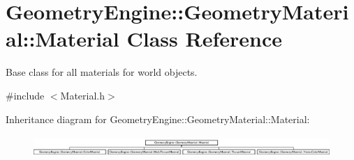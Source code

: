 \hypertarget{class_geometry_engine_1_1_geometry_material_1_1_material}{}\section{Geometry\+Engine\+::Geometry\+Material\+::Material Class Reference}
\label{class_geometry_engine_1_1_geometry_material_1_1_material}


Base class for all materials for world objects.  




{\ttfamily \#include $<$Material.\+h$>$}

Inheritance diagram for Geometry\+Engine\+::Geometry\+Material\+::Material\+:\begin{figure}[H]
\begin{center}
\leavevmode
\includegraphics[height=0.823529cm]{class_geometry_engine_1_1_geometry_material_1_1_material}
\end{center}
\end{figure}
